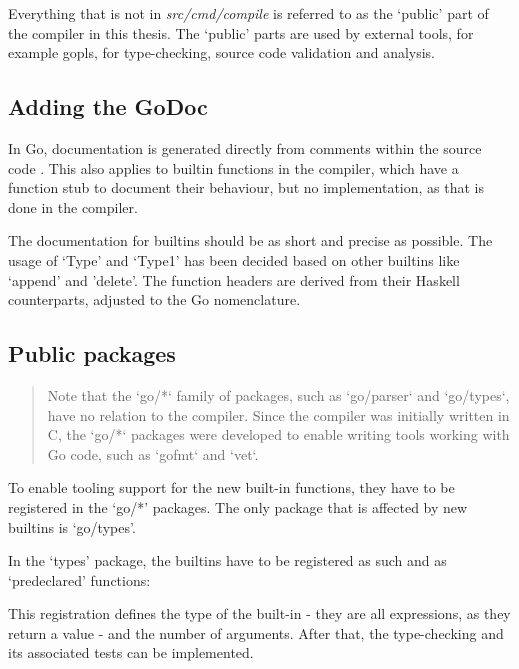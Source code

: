 
Everything that is not in \textit{src/cmd/compile} is referred to as the `public'
part of the compiler in this thesis. The `public' parts are used by external
tools, for example \gls{gopls}, for type-checking, source code validation and
analysis.

\subsection{Adding the GoDoc}
In Go, documentation is generated directly from comments within the source code
\autocite{godoc}. This also applies to builtin functions in the compiler, which
have a function stub to document their behaviour\autocite{godoc-builtin}, but
no implementation, as that is done in the compiler\autocite{builtin-impl}.

The documentation for builtins should be as short and precise as possible.
The usage of `Type' and `Type1' has been decided based on other builtins
like `append' and 'delete'.
The function headers are derived from their Haskell counterparts, adjusted
to the Go nomenclature.

\begin{code}
\end{code}
\subsection{Public packages}

\begin{quote}
Note that the `go/*` family of packages, such as `go/parser` and `go/types`,
have no relation to the compiler. Since the compiler was initially written in C,
the `go/*` packages were developed to enable writing tools working with Go code,
such as `gofmt` and `vet`.\autocite{compiler-readme}
\end{quote}

To enable tooling support for the new built-in functions, they have to be
registered in the `go/*' packages. The only package that is affected by new
builtins is `go/types'.

In the `types' package, the builtins have to be registered as such and as
`predeclared' functions:

\begin{code}
\end{code}
This registration defines the type of the built-in - they are all expressions,
as they return a value - and the number of arguments.
After that, the type-checking and its associated tests can be implemented.

